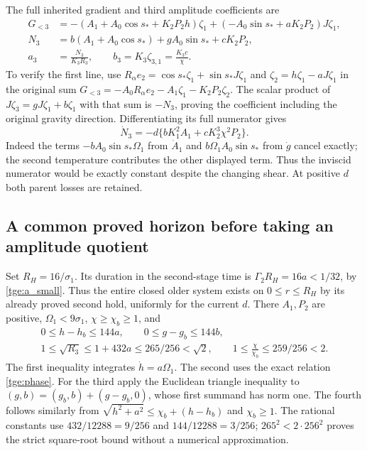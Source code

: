 The full inherited gradient and third amplitude coefficients are
\begin{align}
 G_{<3}&=-(A_1+A_0\cos s_*+K_2P_2h)\zeta_1
              +(-A_0\sin s_*+aK_2P_2)J\zeta_1,\nonumber\\
 N_3&=b(A_1+A_0\cos s_*)+gA_0\sin s_*+cK_2P_2,\nonumber\\
 a_3&=\frac{N_3}{K_3R_3},\qquad
 b_3=K_3\zeta_{3,1}=\frac{K_3c}{\chi}.
 \label{tge:coefficients}
\end{align}
To verify the first line, use
$R_\alpha e_2=\cos s_*\zeta_1+\sin s_*J\zeta_1$ and
$\zeta_2=h\zeta_1-aJ\zeta_1$ in the original sum
$G_{<3}=-A_0R_\alpha e_2-A_1\zeta_1-K_2P_2\zeta_2$.
The scalar product of $J\zeta_3=gJ\zeta_1+b\zeta_1$ with
that sum is $-N_3$, proving the coefficient including the original
gravity direction. Differentiating its full numerator gives
\begin{equation}\label{tge:Ndot}
 \dot N_3=-d\{bK_1^2A_1+cK_2^3\chi^2P_2\}.
\end{equation}
Indeed the terms $-bA_0\sin s_*\Omega_1$ from $\dot A_1$
and $b\Omega_1 A_0\sin s_*$ from $\dot g$ cancel exactly;
the second temperature contributes the other displayed term.
Thus the inviscid numerator would be exactly constant despite the
changing shear. At positive $d$ both parent losses are retained.

\subsection{A common proved horizon before taking an amplitude quotient}

Set $R_H=16/\sigma_1$. Its duration in the second-stage time is
$\Gamma_2R_H=16a<1/32$, by \eqref{tge:a_small}.
Thus the entire closed older system exists on $0\leq r\leq R_H$
by its already proved second hold, uniformly for the current $d$.
There $A_1,P_2$ are positive, $\Omega_1<9\sigma_1$,
$\chi\geq\chi_b\geq1$, and
\begin{equation}\label{tge:horizon_geometry}
\begin{gathered}
 0\leq h-h_b\leq144a,\qquad
 0\leq g-g_b\leq144b,\\
 1\leq\sqrt{R_3}\leq1+432a\leq265/256<\sqrt2,
 \qquad1\leq\frac{\chi}{\chi_b}\leq259/256<2.
\end{gathered}
\end{equation}
The first inequality integrates $\dot h=a\Omega_1$.
The second uses the exact relation \eqref{tge:phase}.
For the third apply the Euclidean triangle inequality to
$(g,b)=(g_b,b)+(g-g_b,0)$, whose first summand has norm one.
The fourth follows similarly from
$\sqrt{h^2+a^2}\leq\chi_b+(h-h_b)$ and $\chi_b\geq1$.
The rational constants use $432/12288=9/256$ and
$144/12288=3/256$; $265^2<2\cdot256^2$ proves the strict square-root
bound without a numerical approximation.

